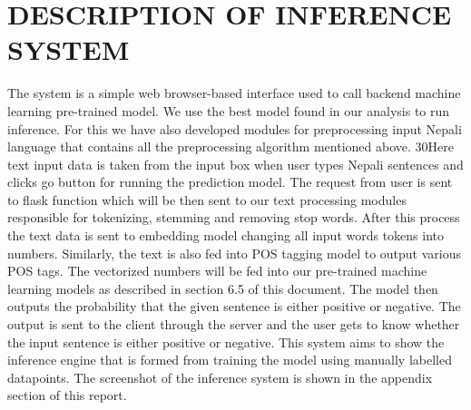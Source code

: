         \section{DESCRIPTION OF INFERENCE SYSTEM}
The system is a simple web browser-based interface used to call backend machine
learning pre-trained model. We use the best model found in our analysis to run
inference. For this we have also developed modules for preprocessing input Nepali
language that contains all the preprocessing algorithm mentioned above.
30Here text input data is taken from the input box when user types Nepali sentences and
clicks go button for running the prediction model. The request from user is sent to flask
function which will be then sent to our text processing modules responsible for
tokenizing, stemming and removing stop words. After this process the text data is sent
to embedding model changing all input words tokens into numbers. Similarly, the text
is also fed into POS tagging model to output various POS tags. The vectorized numbers
will be fed into our pre-trained machine learning models as described in section 6.5 of
this document. The model then outputs the probability that the given sentence is either
positive or negative. The output is sent to the client through the server and the user gets
to know whether the input sentence is either positive or negative.
This system aims to show the inference engine that is formed from training the model
using manually labelled datapoints. The screenshot of the inference system is shown in
the appendix section of this report.